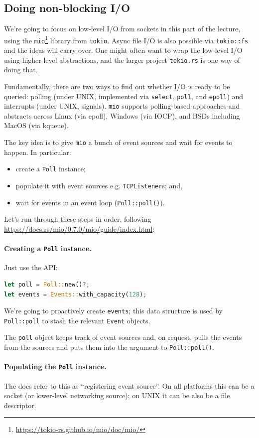 \documentclass[a4paper]{report}
\begin{document}
\subsection*{Doing non-blocking I/O}
We're going to focus on low-level I/O from sockets in this part of the lecture,
using the \texttt{mio}\footnote{\url{https://tokio-rs.github.io/mio/doc/mio/}} library from \texttt{tokio}. Async file I/O is
also possible via \texttt{tokio::fs} and the ideas will carry over.
One might often want to wrap the low-level I/O using higher-level
abstractions, and the larger project \texttt{tokio.rs} is one way of
doing that.

Fundamentally,
there are two ways to find out whether I/O is ready to be queried:
polling (under UNIX, implemented via {\tt select}, {\tt poll}, and
{\tt epoll}) and interrupts (under UNIX, signals). \texttt{mio}
supports polling-based approaches and abstracts across Linux (via
epoll), Windows (via IOCP), and BSDs including MacOS (via kqueue).

The key idea is to give {\tt mio} a bunch of event sources and
wait for events to happen. In particular:
     \begin{itemize}[noitemsep,topsep=-1em]
       \item create a \texttt{Poll} instance;
       \item populate it with event sources e.g. \texttt{TCPListener}s; and,
       \item wait for events in an event loop ({\tt Poll::poll()}).
     \end{itemize}
Let's run through these steps in order, following \url{https://docs.rs/mio/0.7.0/mio/guide/index.html}:

\paragraph{Creating a {\tt Poll} instance.} Just use the API:
    \begin{lstlisting}[language=Rust]
let poll = Poll::new()?;
let events = Events::with_capacity(128);
    \end{lstlisting}
We're going to proactively create \texttt{events}; this data structure is used by
\texttt{Poll::poll} to stash the relevant \texttt{Event} objects.

The \texttt{poll} object keeps track of event sources and,
on request, pulls the events from the sources and puts them
into the argument to \texttt{Poll::poll()}.

\paragraph{Populating the {\tt Poll} instance.} The docs refer
to this as ``registering event source''. On all platforms this can be
a socket (or lower-level networking source); on UNIX it can be also be
a file descriptor.
\end{document}
